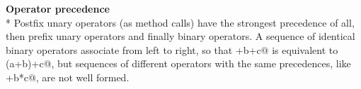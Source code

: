 \parbox{\linewidth}{
\textbf{Operator precedence}
\small\\*
Postfix unary operators (as method calls)
have the strongest precedence of all,
then prefix unary operators and finally binary operators.
A sequence of identical binary operators associate from left to right,
so that \Q@a+b+c@ is equivalent to \Q@(a+b)+c@,
but sequences of different operators with the same precedences, like \Q@a+b*c@, are not well formed.
}
 
